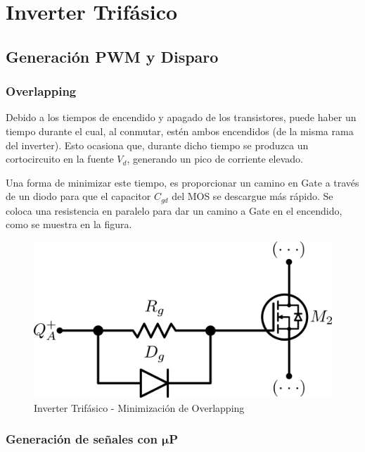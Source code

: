 \documentclass[e4_tp3_main.tex]{subfiles}
\begin{document}

\section{Inverter Trifásico}

\subsection{Generación PWM y Disparo}

\subsubsection{Overlapping}

Debido a los tiempos de encendido y apagado de los transistores, puede haber un tiempo durante el cual, al conmutar, estén ambos encendidos (de la misma rama del inverter). Esto ocasiona que, durante dicho tiempo se produzca un cortocircuito en la fuente $V_d$, generando un pico de corriente elevado. \par
Una forma de minimizar este tiempo, es proporcionar un camino en Gate a través de un diodo para que el capacitor $C_{gd}$ del MOS se descargue más rápido. Se coloca una resistencia en paralelo para dar un camino a Gate en el encendido, como se muestra en la figura.

\begin{figure}[H]
\centering
\includegraphics[width=0.5\linewidth]{Imagenes/overlap.png}
\caption{Inverter Trifásico - Minimización de Overlapping}
\end{figure}

\subsubsection{Generación de señales con $\mathbf{\mu}$P}
\end{document}
